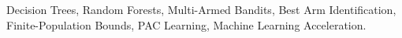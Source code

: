\documentclass[11pt,journal,onecolumn]{IEEEtran}
\begin{document}
\begin{IEEEkeywords}
Decision Trees, Random Forests, Multi-Armed Bandits, Best Arm Identification, Finite-Population Bounds, PAC Learning, Machine Learning Acceleration.
\end{IEEEkeywords}










\end{document}
